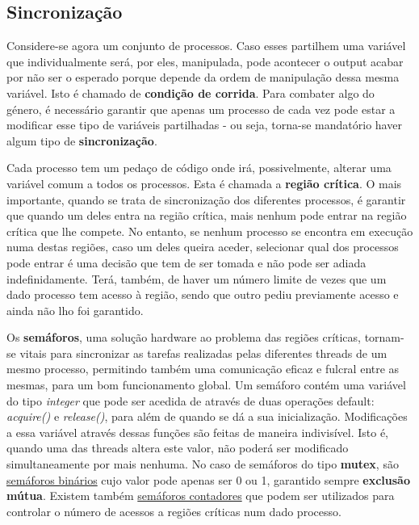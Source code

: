 \documentclass[10pt,portuguese]{article}
\begin{document}
\subsection{Sincronização}
\par Considere-se agora um conjunto de processos. Caso esses partilhem uma variável que individualmente será, por eles, manipulada, pode acontecer o output acabar por não ser o esperado porque depende da ordem de manipulação dessa mesma variável. Isto é chamado de \textbf{condição de corrida}. Para combater algo do género, é necessário garantir que apenas um processo de cada vez pode estar a modificar esse tipo de variáveis partilhadas - ou seja, torna-se mandatório haver algum tipo de \textbf{sincronização}.
\par Cada processo tem um pedaço de código onde irá, possivelmente, alterar uma variável comum a todos os processos. Esta é chamada a \textbf{região crítica}. O mais importante, quando se trata de sincronização dos diferentes processos, é garantir que quando um deles entra na região crítica, mais nenhum pode entrar na região crítica que lhe compete. No entanto, se nenhum processo se encontra em execução numa destas regiões, caso um deles queira aceder, selecionar qual dos processos pode entrar é uma decisão que tem de ser tomada e não pode ser adiada indefinidamente. Terá, também, de haver um número limite de vezes que um dado processo tem acesso à região, sendo que outro pediu previamente acesso e ainda não lho foi garantido.
\par Os \textbf{semáforos}, uma solução hardware ao problema das regiões críticas, tornam-se vitais para sincronizar as tarefas realizadas pelas diferentes threads de um mesmo processo, permitindo também uma comunicação eficaz e fulcral entre as mesmas, para um bom funcionamento global. Um semáforo contém uma variável do tipo \textit{integer} que pode ser acedida de através de duas operações default: \textit{acquire()} e \textit{release()}, para além de quando se dá a sua inicialização. Modificações a essa variável através dessas funções são feitas de maneira indivisível. Isto é, quando uma das threads altera este valor, não poderá ser modificado simultaneamente por mais nenhuma. No caso de semáforos do tipo \textbf{mutex}, são \underline{semáforos binários} cujo valor pode apenas ser 0 ou 1, garantido sempre \textbf{exclusão mútua}. Existem também \underline{semáforos contadores} que podem ser utilizados para controlar o número de acessos a regiões críticas num dado processo.

\clearpage
\end{document}
